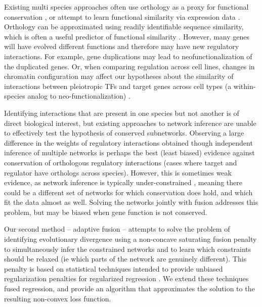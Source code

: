\documentclass[11pt]{article}
\begin{document}
Existing multi species approaches often use orthology as a proxy for functional conservation \cite{roy_arboretum:_2013, penfold_inferring_2015, joshi_multi-species_2015, kashima_simultaneous_2009, zhang2010nearly}, or attempt to learn functional similarity via expression data \cite{gholami_cross-species_2010}. 
Orthology can be approximated using readily identifiable sequence similarity, which is often a useful predictor of functional similarity \cite{wilson_assessing_2000, jensen_eggnog:_2008}. However, many genes will have evolved different functions and therefore may have new regulatory interactions. For example, gene duplications may lead to neofunctionalization \cite{eisen_phylogenomics:_1998} of the duplicated genes. Or, when comparing regulation across cell lines, changes in chromatin configuration may affect our hypotheses about the similarity of interactions between pleiotropic TFs and target genes across cell types (a within-species analog to neo-functionalization) \cite{li_role_2007}. 

Identifying interactions that are present in one species but not another is of direct biological interest, but existing approaches to network inference are unable to effectively test the hypothesis of conserved subnetworks. Observing a large difference in the weights of regulatory interactions obtained though independent inference of multiple networks is perhaps the best (least biased) evidence against conservation of orthologous regulatory interactions (cases where target and regulator have orthologs across species). However, this is sometimes weak evidence, as network inference is typically under-constrained \cite{marbach_revealing_2010}, meaning there could be a different set of networks for which conservation does hold, and which fit the data almost as well. Solving the networks jointly with fusion addresses this problem, but may be biased when gene function is not conserved. 

Our second method -- adaptive fusion -- attempts to solve the problem of identifying evolutionary divergence using a non-concave saturating fusion penalty to simultaneously infer the constrained networks and to learn which constraints should be relaxed (ie which parts of the network are genuinely different). This penalty is based on statistical techniques intended to provide unbiased regularization penalties for regularized regression \cite{zhang2010nearly, fan2001variable}. We extend these techniques fused regression, and provide an algorithm that approximates the solution to the resulting non-convex loss function.
\end{document}
